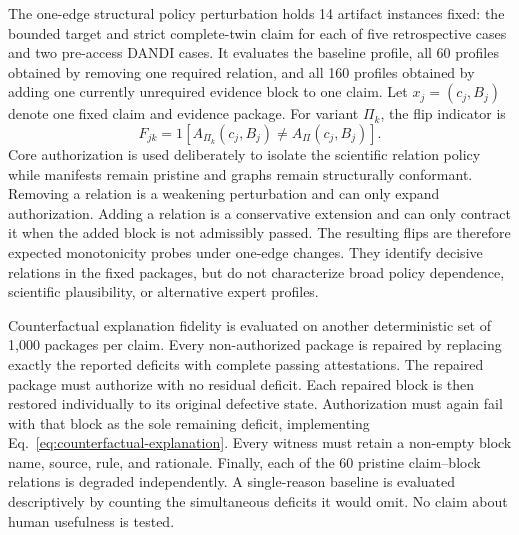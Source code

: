 The one-edge structural policy perturbation holds 14 artifact instances fixed: the bounded target and strict complete-twin claim for each of five retrospective cases and two pre-access DANDI cases. It evaluates the baseline profile, all 60 profiles obtained by removing one required relation, and all 160 profiles obtained by adding one currently unrequired evidence block to one claim. Let $x_j=(c_j,B_j)$ denote one fixed claim and evidence package. For variant $\Pi_k$, the flip indicator is
\begin{equation}
F_{jk}=\mathrm{1}\!\left[A_{\Pi_k}(c_j,B_j)\neq
A_{\Pi}(c_j,B_j)\right].
\label{eq:profile-sensitivity-flip}
\end{equation}
Core authorization is used deliberately to isolate the scientific relation policy while manifests remain pristine and graphs remain structurally conformant. Removing a relation is a weakening perturbation and can only expand authorization. Adding a relation is a conservative extension and can only contract it when the added block is not admissibly passed. The resulting flips are therefore expected monotonicity probes under one-edge changes. They identify decisive relations in the fixed packages, but do not characterize broad policy dependence, scientific plausibility, or alternative expert profiles.

Counterfactual explanation fidelity is evaluated on another deterministic set of 1,000 packages per claim. Every non-authorized package is repaired by replacing exactly the reported deficits with complete passing attestations. The repaired package must authorize with no residual deficit. Each repaired block is then restored individually to its original defective state. Authorization must again fail with that block as the sole remaining deficit, implementing Eq.~\ref{eq:counterfactual-explanation}. Every witness must retain a non-empty block name, source, rule, and rationale. Finally, each of the 60 pristine claim--block relations is degraded independently. A single-reason baseline is evaluated descriptively by counting the simultaneous deficits it would omit. No claim about human usefulness is tested.

